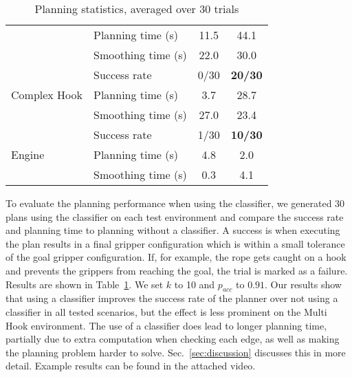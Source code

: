 \begin{table}[t]
\begin{center}
\begin{tabular}{|l|l|c|c|}
                                            & Planning time (s)     & 11.5  & 44.1 \\
                                            & Smoothing time (s)    & 22.0  & 30.0 \\
\hline
\multirow{3}{*}{Complex Hook}               & Success rate          & 0/30  & \textbf{20/30} \\
                                            & Planning time (s)     &  3.7  & 28.7 \\
                                            & Smoothing time (s)    & 27.0  & 23.4 \\
\hline
\multirow{3}{*}{Engine}                     & Success rate          & 1/30  & \textbf{10/30} \\
                                            & Planning time (s)     & 4.8   & 2.0 \\
                                            & Smoothing time (s)    & 0.3   & 4.1 \\
\hline
\end{tabular}
\end{center}
\caption{Planning statistics, averaged over 30  trials}
\label{tab:planning_stats}
\end{table}

To evaluate the planning performance when using the classifier, we generated 30 plans using the classifier on each test environment and compare the success rate and planning time to planning without a classifier. A success is when executing the plan results in a final gripper configuration which is within a small tolerance of the goal gripper configuration. If, for example, the rope gets caught on a hook and prevents the grippers from reaching the goal, the trial is marked as a failure. Results are shown in Table~\ref{tab:planning_stats}. We set $k$ to 10 and $p_{acc}$ to $0.91$. Our results show that using a classifier improves the success rate of the planner over not using a classifier in all tested scenarios, but the effect is less prominent on the Multi Hook environment. The use of a classifier does lead to longer planning time, partially due to extra computation when checking each edge, as well as making the planning problem harder to solve. Sec.~\ref{sec:discussion} discusses this in more detail. Example results can be found in the attached video.




